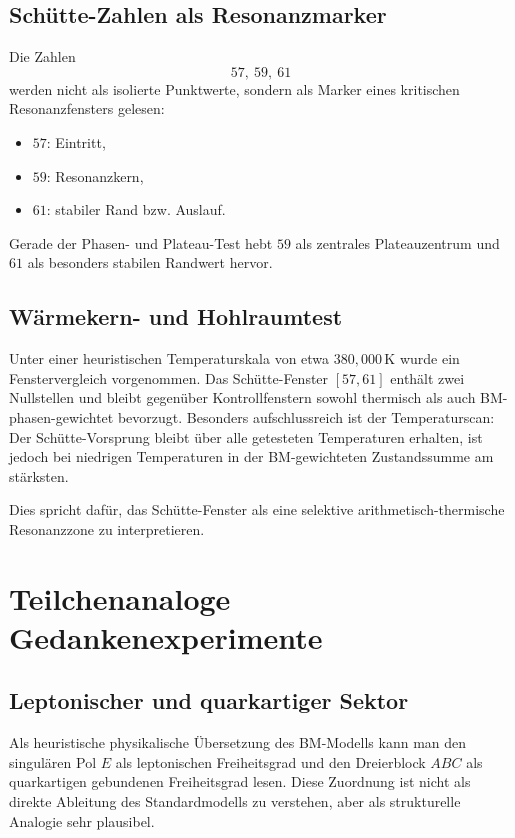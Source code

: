 \documentclass[11pt,a4paper]{article}
\theoremstyle{definition}
\theoremstyle{plain}
\begin{document}
	\subsection{Schütte-Zahlen als Resonanzmarker}
	
	Die Zahlen
	\[
	57,\ 59,\ 61
	\]
	werden nicht als isolierte Punktwerte, sondern als Marker eines kritischen Resonanzfensters gelesen:
	\begin{itemize}[leftmargin=2em]
		\item $57$: Eintritt,
		\item $59$: Resonanzkern,
		\item $61$: stabiler Rand bzw. Auslauf.
	\end{itemize}
	
	Gerade der Phasen- und Plateau-Test hebt $59$ als zentrales Plateauzentrum und $61$ als besonders stabilen Randwert hervor.
	
	\subsection{Wärmekern- und Hohlraumtest}
	
	Unter einer heuristischen Temperaturskala von etwa $380{,}000\,\mathrm K$ wurde ein Fenstervergleich vorgenommen. Das Schütte-Fenster $[57,61]$ enthält zwei Nullstellen und bleibt gegenüber Kontrollfenstern sowohl thermisch als auch BM-phasen-gewichtet bevorzugt. Besonders aufschlussreich ist der Temperaturscan: Der Schütte-Vorsprung bleibt über alle getesteten Temperaturen erhalten, ist jedoch bei niedrigen Temperaturen in der BM-gewichteten Zustandssumme am stärksten.
	
	Dies spricht dafür, das Schütte-Fenster als eine selektive arithmetisch-thermische Resonanzzone zu interpretieren.
	
	\section{Teilchenanaloge Gedankenexperimente}
	
	\subsection{Leptonischer und quarkartiger Sektor}
	
	Als heuristische physikalische Übersetzung des BM-Modells kann man den singulären Pol $E$ als leptonischen Freiheitsgrad und den Dreierblock $ABC$ als quarkartigen gebundenen Freiheitsgrad lesen. Diese Zuordnung ist nicht als direkte Ableitung des Standardmodells zu verstehen, aber als strukturelle Analogie sehr plausibel.
	
\end{document}
